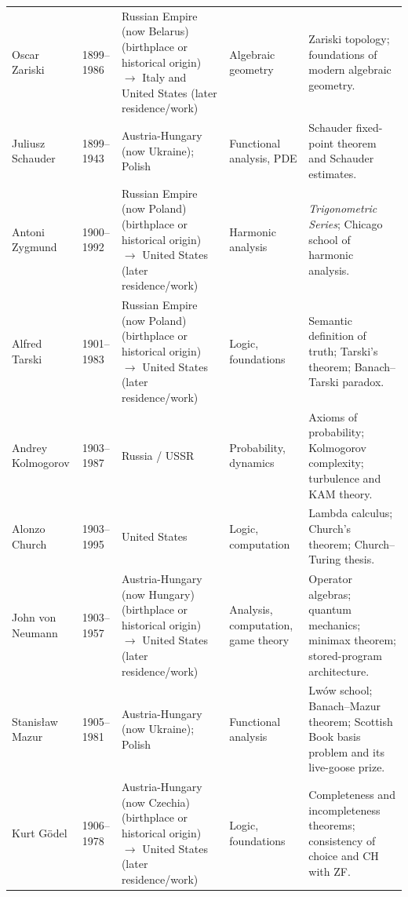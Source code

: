 {\begin{longtable}{@{}L{0.145\textwidth}L{0.09\textwidth}L{0.225\textwidth}L{0.14\textwidth}L{0.30\textwidth}@{}}
        Oscar Zariski
        & 1899--1986
        & Russian Empire (now Belarus) (birthplace or historical origin) \(\to\) Italy and United States (later residence/work)
        & Algebraic geometry
        & Zariski topology; foundations of modern algebraic geometry. \\

        Juliusz Schauder
        & 1899--1943
        & Austria-Hungary (now Ukraine); Polish
        & Functional analysis, PDE
        & Schauder fixed-point theorem and Schauder estimates. \\

        Antoni Zygmund
        & 1900--1992
        & Russian Empire (now Poland) (birthplace or historical origin) \(\to\) United States (later residence/work)
        & Harmonic analysis
        & \textit{Trigonometric Series}; Chicago school of harmonic analysis. \\

        Alfred Tarski
        & 1901--1983
        & Russian Empire (now Poland) (birthplace or historical origin) \(\to\) United States (later residence/work)
        & Logic, foundations
        & Semantic definition of truth; Tarski's theorem; Banach--Tarski
          paradox. \\

        Andrey Kolmogorov
        & 1903--1987
        & Russia / USSR
        & Probability, dynamics
        & Axioms of probability; Kolmogorov complexity; turbulence and KAM
          theory. \\

        Alonzo Church
        & 1903--1995
        & United States
        & Logic, computation
        & Lambda calculus; Church's theorem; Church--Turing thesis. \\

        John von Neumann
        & 1903--1957
        & Austria-Hungary (now Hungary) (birthplace or historical origin) \(\to\) United States (later residence/work)
        & Analysis, computation, game theory
        & Operator algebras; quantum mechanics; minimax theorem; stored-program
          architecture. \\

        Stanisław Mazur
        & 1905--1981
        & Austria-Hungary (now Ukraine); Polish
        & Functional analysis
        & Lwów school; Banach--Mazur theorem; Scottish Book basis problem and
          its live-goose prize. \\

        Kurt Gödel
        & 1906--1978
        & Austria-Hungary (now Czechia) (birthplace or historical origin) \(\to\) United States (later residence/work)
        & Logic, foundations
        & Completeness and incompleteness theorems; consistency of choice and
          CH with ZF. \\


\end{longtable}}
